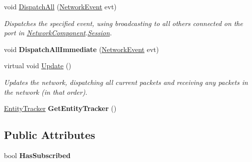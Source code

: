 \begin{DoxyCompactItemize}
void \hyperlink{class_skyrates_1_1_common_1_1_network_1_1_network_common_a5855288bb041d84f998da97347f7b3ee}{Dispatch\-All} (\hyperlink{class_skyrates_1_1_common_1_1_network_1_1_event_1_1_network_event}{Network\-Event} evt)
\begin{DoxyCompactList}\small\item\em Dispatches the specified event, using broadcasting to all others connected on the port in \hyperlink{class_skyrates_1_1_common_1_1_network_1_1_network_component}{Network\-Component}.\hyperlink{class_skyrates_1_1_common_1_1_network_1_1_session}{Session}. \end{DoxyCompactList}\item 
\hypertarget{class_skyrates_1_1_common_1_1_network_1_1_network_common_a3224df115337518157c02a498c4ece8a}{void {\bfseries Dispatch\-All\-Immediate} (\hyperlink{class_skyrates_1_1_common_1_1_network_1_1_event_1_1_network_event}{Network\-Event} evt)}\label{class_skyrates_1_1_common_1_1_network_1_1_network_common_a3224df115337518157c02a498c4ece8a}

\item 
virtual void \hyperlink{class_skyrates_1_1_common_1_1_network_1_1_network_common_aeeaf913a5fe9ee8cb966271ee864bc08}{Update} ()
\begin{DoxyCompactList}\small\item\em Updates the network, dispatching all current packets and receiving any packets in the network (in that order). \end{DoxyCompactList}\item 
\hypertarget{class_skyrates_1_1_common_1_1_network_1_1_network_common_a3a5e3ec0296bff9c7507de2e205f14c7}{\hyperlink{class_skyrates_1_1_common_1_1_entity_1_1_entity_tracker}{Entity\-Tracker} {\bfseries Get\-Entity\-Tracker} ()}\label{class_skyrates_1_1_common_1_1_network_1_1_network_common_a3a5e3ec0296bff9c7507de2e205f14c7}

\end{DoxyCompactItemize}
\subsection*{Public Attributes}
\begin{DoxyCompactItemize}
\item 
\hypertarget{class_skyrates_1_1_common_1_1_network_1_1_network_common_a9f833b15b7d54ca778c662c0223f3ee9}{bool {\bfseries Has\-Subscribed}}\label{class_skyrates_1_1_common_1_1_network_1_1_network_common_a9f833b15b7d54ca778c662c0223f3ee9}

\end{DoxyCompactItemize}
